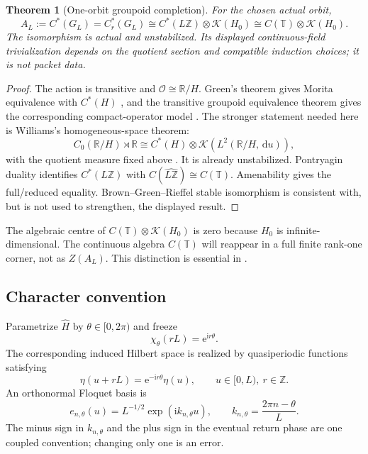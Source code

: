\documentclass[11pt]{article}
\newtheorem{theorem}{Theorem}[section]
\theoremstyle{definition}
\newcommand{\R}{\mathbb{R}}
\newcommand{\Z}{\mathbb{Z}}
\newcommand{\T}{\mathbb{T}}
\newcommand{\K}{\mathcal{K}}
\newcommand{\dd}{\,\mathrm{d}}
\newcommand{\e}{\mathrm{e}}
\newcommand{\ii}{\mathrm{i}}
\begin{document}
\begin{theorem}[One-orbit groupoid completion]\label{thm:completion}
For the chosen actual orbit,
\[
 A_L:=C^*(G_L)=C_r^*(G_L)
 \cong C^*(L\Z)\otimes\K(H_0)
 \cong C(\T)\otimes\K(H_0).
\]
The isomorphism is actual and unstabilized.  Its displayed continuous-field trivialization depends on the quotient section and compatible induction choices; it is not packet data.
\end{theorem}

\begin{proof}
The action is transitive and \(\mathcal O\cong\R/H\).  Green's theorem gives Morita equivalence with \(C^*(H)\) \cite[Proposition~3, p.~203]{Green1978}, and the transitive groupoid equivalence theorem gives the corresponding compact-operator model \cite[Theorems~2.8 and~3.1]{MuhlyRenaultWilliams1987}.  The stronger statement needed here is Williams's homogeneous-space theorem:
\[
 C_0(\R/H)\rtimes\R
 \cong C^*(H)\otimes\K(L^2(\R/H,\dd u)),
\]
with the quotient measure fixed above \cite[Theorem~4.30, p.~138]{Williams2007}.  It is already unstabilized.  Pontryagin duality identifies \(C^*(L\Z)\) with \(C(\widehat{L\Z})\cong C(\T)\).  Amenability gives the full/reduced equality.  Brown--Green--Rieffel stable isomorphism \cite[Theorem~1.2]{BrownGreenRieffel1977} is consistent with, but is not used to strengthen, the displayed result.
\end{proof}

The algebraic centre of \(C(\T)\otimes\K(H_0)\) is zero because \(H_0\) is infinite-dimensional.  The continuous algebra \(C(\T)\) will reappear in a full finite rank-one corner, not as \(Z(A_L)\).  This distinction is essential in .

\subsection{Character convention}

Parametrize \(\widehat H\) by \(\theta\in[0,2\pi)\) and freeze
\begin{equation}
 \chi_\theta(rL)=\e^{\ii r\theta}.\label{eq:character}
\end{equation}
The corresponding induced Hilbert space is realized by quasiperiodic functions satisfying
\begin{equation}
 \eta(u+rL)=\e^{-\ii r\theta}\eta(u),\qquad u\in[0,L),\ r\in\Z.\label{eq:quasi}
\end{equation}
An orthonormal Floquet basis is
\[
 e_{n,\theta}(u)=L^{-1/2}\exp(\ii k_{n,\theta}u),\qquad
 k_{n,\theta}=\frac{2\pi n-\theta}{L}.
\]
The minus sign in \(k_{n,\theta}\) and the plus sign in the eventual return phase are one coupled convention; changing only one is an error.
\end{document}
